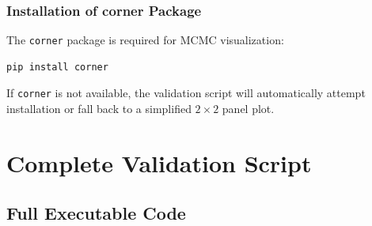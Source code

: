 \documentclass[11pt]{article}
\begin{document}
\subsubsection{Installation of corner Package}

The \texttt{corner} package is required for MCMC visualization:

\begin{lstlisting}[language=bash]
pip install corner
\end{lstlisting}

If \texttt{corner} is not available, the validation script will automatically attempt installation or fall back to a simplified $2\times 2$ panel plot.

\section{Complete Validation Script}

\subsection{Full Executable Code}
\end{document}
